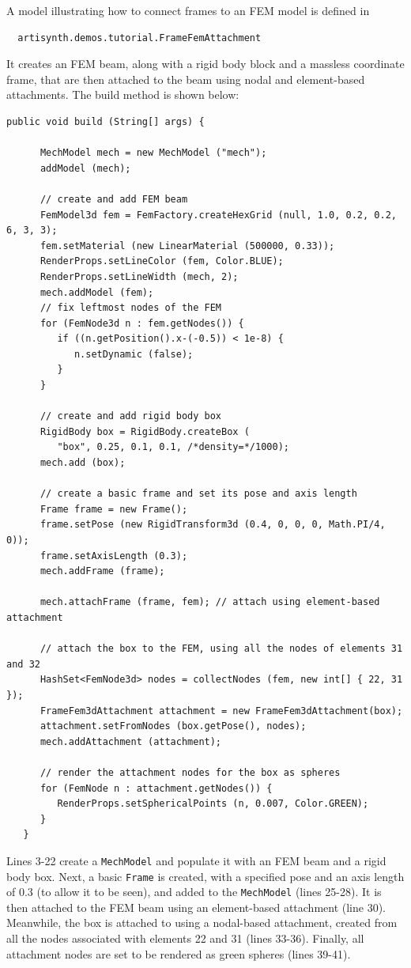 A model illustrating how to connect frames to an FEM model 
is defined in
%
\begin{verbatim}
  artisynth.demos.tutorial.FrameFemAttachment
\end{verbatim}
%
It creates an FEM beam, along with a rigid body block and a 
massless coordinate frame, that are then attached to the beam
using nodal and element-based attachments. The build method is shown below:
\lstset{numbers=left}
\begin{lstlisting}[]
   public void build (String[] args) {

      MechModel mech = new MechModel ("mech");
      addModel (mech);

      // create and add FEM beam 
      FemModel3d fem = FemFactory.createHexGrid (null, 1.0, 0.2, 0.2, 6, 3, 3);
      fem.setMaterial (new LinearMaterial (500000, 0.33));
      RenderProps.setLineColor (fem, Color.BLUE);
      RenderProps.setLineWidth (mech, 2);
      mech.addModel (fem);
      // fix leftmost nodes of the FEM
      for (FemNode3d n : fem.getNodes()) {
         if ((n.getPosition().x-(-0.5)) < 1e-8) {
            n.setDynamic (false);
         }
      }

      // create and add rigid body box
      RigidBody box = RigidBody.createBox (
         "box", 0.25, 0.1, 0.1, /*density=*/1000);
      mech.add (box);

      // create a basic frame and set its pose and axis length
      Frame frame = new Frame();
      frame.setPose (new RigidTransform3d (0.4, 0, 0, 0, Math.PI/4, 0));
      frame.setAxisLength (0.3);
      mech.addFrame (frame);

      mech.attachFrame (frame, fem); // attach using element-based attachment

      // attach the box to the FEM, using all the nodes of elements 31 and 32
      HashSet<FemNode3d> nodes = collectNodes (fem, new int[] { 22, 31 });
      FrameFem3dAttachment attachment = new FrameFem3dAttachment(box);
      attachment.setFromNodes (box.getPose(), nodes);
      mech.addAttachment (attachment);

      // render the attachment nodes for the box as spheres
      for (FemNode n : attachment.getNodes()) {
         RenderProps.setSphericalPoints (n, 0.007, Color.GREEN);
      }
   }
\end{lstlisting}
\lstset{numbers=none} 
Lines 3-22 create a {\tt MechModel} and populate it with an FEM beam
and a rigid body box. Next, a basic {\tt Frame} is created, with a
specified pose and an axis length of 0.3 (to allow it to be seen), and
added to the {\tt MechModel} (lines 25-28). It is then attached to the
FEM beam using an element-based attachment (line 30).  Meanwhile, the
box is attached to using a nodal-based attachment, created from all
the nodes associated with elements 22 and 31 (lines 33-36). Finally,
all attachment nodes are set to be rendered as green spheres (lines
39-41).

